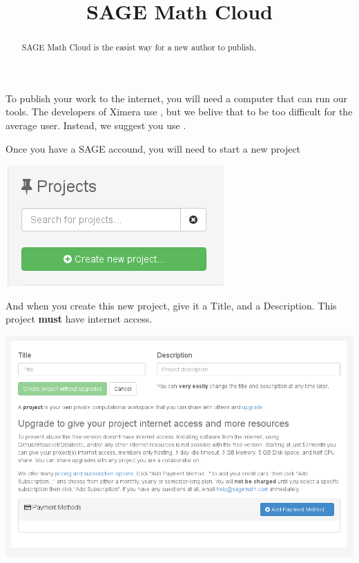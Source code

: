 \documentclass{ximera}
\title{SAGE Math Cloud}
\begin{document}
\begin{abstract}
SAGE Math Cloud is the easist way for a new author to publish.
\end{abstract}
\maketitle

To publish your work to the internet, you will need a computer that
can run our tools. The developers of Ximera use , but we belive that to be too difficult for the average user. Instead, we suggest you use .

Once you have a SAGE accound, you will need to start a new project

\begin{image}
  \includegraphics{createNewProject.png}
\end{image}

And when you create this new project, give it a Title, and a
Description. This project \textbf{must} have internet access.
\begin{image}
  \includegraphics{internet.png}
\end{image}
\end{document}
